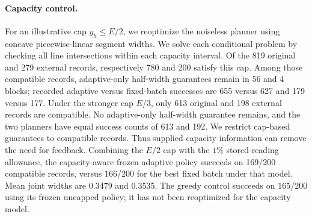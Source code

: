 \documentclass[12pt]{article}
\begin{document}
\paragraph{Capacity control.}
For an illustrative cap $y_h\leq E/2$, we reoptimize the noiseless planner
using concave piecewise-linear segment widths. We solve each conditional
problem by checking all line intersections within each capacity interval.
Of the 819 original and 279 external records, respectively 780 and 200 satisfy
this cap. Among those compatible records, adaptive-only half-width guarantees
remain in 56 and 4 blocks; recorded adaptive versus fixed-batch successes
are 655 versus 627 and 179 versus 177. Under the stronger cap $E/3$, only
613 original and 198 external records are compatible. No adaptive-only
half-width guarantee remains, and the two planners have equal success counts
of 613 and 192. We restrict cap-based guarantees to compatible records.
Thus supplied capacity information can remove the need for feedback.
Combining the $E/2$ cap with the $1\%$ stored-reading allowance, the
capacity-aware frozen adaptive policy succeeds on 169/200 compatible records,
versus 166/200 for the best fixed batch under that model. Mean joint widths
are 0.3479 and 0.3535. The greedy control succeeds on 165/200 using its
frozen uncapped policy; it has not been reoptimized for the capacity model.
\end{document}
